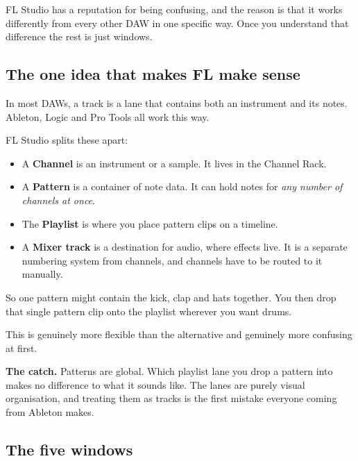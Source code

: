 FL Studio has a reputation for being confusing, and the reason is that it works differently
from every other DAW in one specific way. Once you understand that difference the rest is
just windows.

\subsection{The one idea that makes FL make sense}\label{fl01_interface-the-one-idea-that-makes-fl-make-sense}

In most DAWs, a track is a lane that contains both an instrument and its notes. Ableton,
Logic and Pro Tools all work this way.

FL Studio splits these apart:

\begin{itemize}
\tightlist
\item
  A \textbf{Channel} is an instrument or a sample. It lives in the Channel Rack.
\item
  A \textbf{Pattern} is a container of note data. It can hold notes for \emph{any number of channels
  at once}.
\item
  The \textbf{Playlist} is where you place pattern clips on a timeline.
\item
  A \textbf{Mixer track} is a destination for audio, where effects live. It is a separate
  numbering system from channels, and channels have to be routed to it manually.
\end{itemize}

So one pattern might contain the kick, clap and hats together. You then drop that single
pattern clip onto the playlist wherever you want drums.

This is genuinely more flexible than the alternative and genuinely more confusing at first.

\begin{pitfallbox}
\textbf{The catch.} Patterns are global. Which playlist lane you drop a pattern into makes no
difference to what it sounds like. The lanes are purely visual organisation, and treating
them as tracks is the first mistake everyone coming from Ableton makes.
\end{pitfallbox}

\subsection{The five windows}\label{fl01_interface-the-five-windows}

